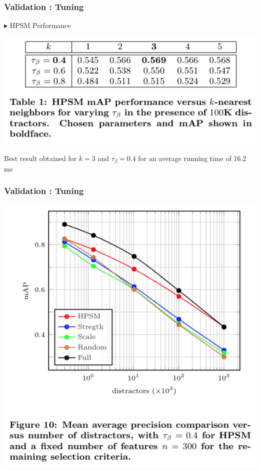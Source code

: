 \documentclass[11pt]{beamer}
\begin{document}
\begin{frame}
\frametitle{Validation : Tuning}
$\blacktriangleright$ HPSM Performance
\begin{center}
\includegraphics[scale=0.8]{table1}
\end{center}
Best result obtained for $k = 3$ and $\tau_\beta = 0.4$ for an average running time of 16.2 ms
\end{frame}

\begin{frame}
\frametitle{Validation : Tuning}
\begin{center}
\includegraphics[scale=0.55]{figure10}
\end{center}
\end{frame}
\end{document}
